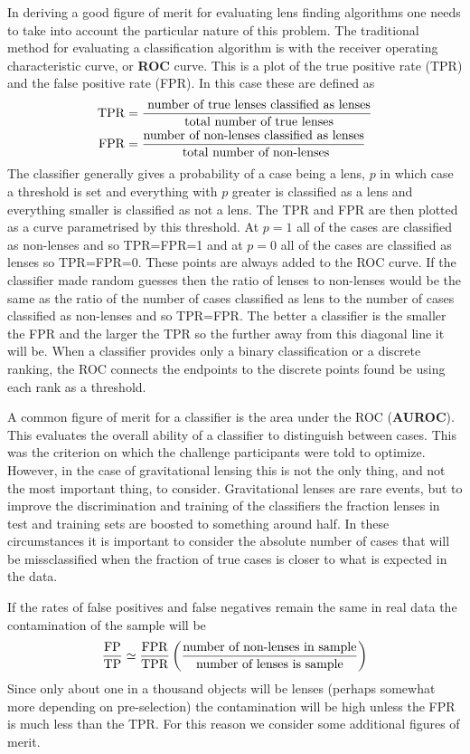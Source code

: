 \documentclass[useAMS,usenatbib]{mnras}
\begin{document}
In deriving a good figure of merit for evaluating lens finding algorithms one needs to take into account the particular nature of this problem.
The traditional method for evaluating a classification algorithm is with the receiver operating characteristic curve, or {\bf ROC} curve.  This is a plot of the true positive rate (TPR) and the false positive rate (FPR).  In this case these are defined as
\begin{align}
{\rm TPR} &= \frac{\textrm{ number of true lenses classified as lenses}}{\textrm{ total number of true lenses}} \\
{\rm FPR} &= \frac{\textrm{number of non-lenses classified as lenses}}{\textrm{ total number of non-lenses}}
\end{align}
The classifier generally gives a probability of a case being a lens, $p$ in which case a threshold is set and everything with $p$ greater is classified as a lens and everything smaller is classified as not a lens.  The TPR and FPR are then plotted as a curve parametrised by this threshold.  At $p=1$ all of the cases are classified as non-lenses and so TPR=FPR=1 and at $p=0$ all of the cases are classified as lenses so TPR=FPR=0.  These points are always added to the ROC curve.  If the classifier made random guesses then the ratio of lenses to non-lenses would be the same as the ratio of the number of cases classified as lens to the number of cases classified as non-lenses and so TPR=FPR.  The better a classifier is the smaller the FPR and the larger the TPR so the further away from this diagonal line it will be.  When a classifier provides only a binary classification or a discrete ranking, the ROC connects the endpoints to the discrete points found be using each rank as a threshold.

A common figure of merit for a classifier is the area under the ROC ({\bf AUROC}).  This evaluates the overall ability of a classifier to distinguish between cases.  This was the criterion on which the challenge participants were told to optimize.  However, in the case of gravitational lensing this is not the only thing, and not the most important thing, to consider.  Gravitational lenses are rare events, but to improve the discrimination and training of the classifiers the fraction lenses in test and training sets are boosted to something around half.  In these circumstances it is important to consider the absolute number of cases that will be missclassified when the fraction of true cases is closer to what is expected in the data.

If the rates of false positives and false negatives remain the same in real data  the contamination of the sample will be
\begin{align}
\frac{\rm FP}{\rm TP} \simeq \frac{\rm FPR}{\rm TPR} \left(\frac{\textrm{number of non-lenses in sample}}{\textrm{number of lenses is sample}} \right)
\end{align}
Since only about one in a thousand objects will be lenses (perhaps somewhat more depending on pre-selection) the contamination will be high unless the FPR is much less than the TPR.  For this reason we consider some additional figures of merit.
\end{document}
